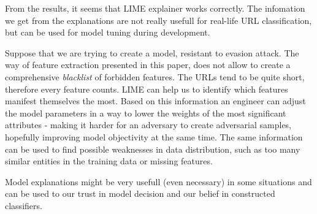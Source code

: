 From the results, it seems that LIME explainer works correctly.
The infomation we get from the explanations are not really usefull for real-life URL classification, but can be used for model tuning during development.

Suppose that we are trying to create a model, resistant to evasion attack.
The way of feature extraction presented in this paper, does not allow to create a comprehensive \textit{blacklist} of forbidden features.
The URLs tend to be quite short, therefore every feature counts.
LIME can help us to identify which features manifest themselves the most.
Based on this information an engineer can adjust the model parameters in a way to lower the weights of the most significant attributes - making it harder for an adversary to create adversarial samples, hopefully improving model objectivity at the same time.
The same information can be used to find possible weaknesses in data distribution, such as too many similar entities in the training data or missing features.

Model explanations might be very usefull (even necessary) in some situations and can be used to  our trust in model decision and our belief in constructed classifiers.
